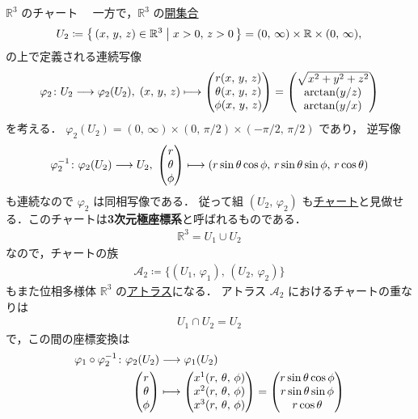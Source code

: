 \documentclass[geometry_main]{subfiles}
\begin{document}
\begin{myexample}[]{$\mathbb{R}^3$ のチャート}
	　一方で，$\mathbb{R}^3$ の\hyperref[def.openset]{開集合}
	\begin{align}
		U_2 &\coloneqq \bigl\{\, (x,\, y,\, z) \in \mathbb{R}^3 \bigm| x > 0,\, z > 0 \,\bigr\} = (0,\, \infty) \times \mathbb{R} \times (0,\, \infty), \\
	\end{align}
	の上で定義される連続写像
	\begin{align}
		\varphi_2 \colon U_2 \lto \varphi_2(U_2),\;
		(x,\, y,\, z) \lmto \mqty(r(x,\, y,\, z) \\ \theta(x,\, y,\, z) \\ \phi(x,\, y,\, z)) = \mqty(\sqrt{x^2 + y^2 + z^2} \\ \arctan(y/z) \\ \arctan(y/x))
	\end{align}
	を考える．
	$\varphi_2 (U_2) = (0,\, \infty) \times (0,\, \pi/2) \times (-\pi/2,\, \pi/2)$ であり，
	逆写像
	\begin{align}
		\varphi_2^{-1} \colon \varphi_2(U_2) \lto U_2,\;
		\mqty(r \\ \theta \\ \phi) \lmto (r \sin\theta \cos\phi, \, r\sin\theta \sin\phi,\, r\cos\theta)
	\end{align}
	も連続なので $\varphi_2$ は同相写像である．
	従って組 $(U_2,\, \varphi_2)$ も\hyperref[def.localcoord]{チャート}と見做せる．このチャートは\textbf{3次元極座標系}と呼ばれるものである．
	\begin{align}
		\mathbb{R}^3 = U_1 \cup U_2
	\end{align}
	なので，チャートの族
	\begin{align}
		\mathcal{A}_2 \coloneqq \bigl\{(U_1,\, \varphi_1),\, (U_2,\, \varphi_2)  \bigr\}
	\end{align}
	もまた位相多様体 $\mathbb{R}^3$ の\hyperref[def.atlas]{アトラス}になる．
	アトラス $\mathcal{A}_2$ におけるチャートの重なりは
	\begin{align}
		U_1 \cap U_2 = U_2
	\end{align}
	で，この間の座標変換は
	\begin{align}
		\varphi_1 \circ \varphi_2^{-1} \colon \varphi_2(U_2) &\lto \varphi_1(U_2) \\
		\mqty(r \\ \theta \\ \phi) &\lmto \mqty(x^1(r,\, \theta,\, \phi) \\ x^2(r,\, \theta,\, \phi) \\ x^3(r,\, \theta,\, \phi)) = \mqty(r \sin\theta \cos\phi \\ r\sin\theta \sin\phi \\ r\cos\theta)

\end{align}
\end{myexample}
\end{document}
